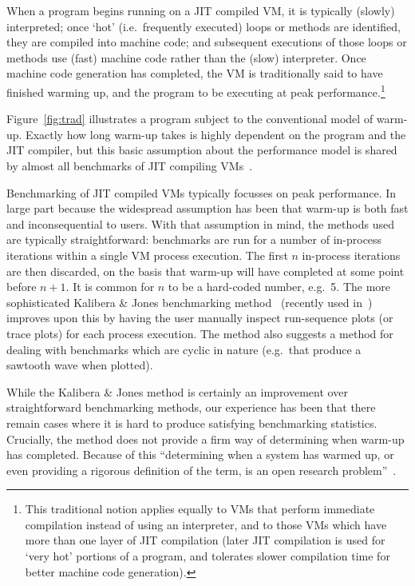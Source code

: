 \documentclass[preprint]{sigplanconf}
\newcommand{\kalibera}{Kalibera \& Jones\xspace}
\begin{document}
When a program begins running on a JIT compiled VM, it is typically (slowly)
interpreted; once `hot' (i.e.~frequently executed) loops or methods are
identified, they are compiled into machine code; and subsequent
executions of those loops or methods use (fast) machine code rather than the
(slow) interpreter. Once machine code generation has completed, the VM is
traditionally said to have finished warming up, and the program to be executing
at peak performance.\footnote{This traditional notion applies equally to VMs
that perform immediate compilation instead of using an interpreter, and to
those VMs which have more than one layer of JIT compilation (later JIT
compilation is used for `very hot' portions of a program, and tolerates slower
compilation time for better machine code generation).}

Figure~\ref{fig:trad} illustrates a
program subject to the conventional model of warm-up. Exactly how long warm-up
takes is highly dependent on
the program and the JIT compiler, but this basic assumption about the
performance model is shared by almost all benchmarks of JIT compiling
VMs~\cite{kalibera13rigorous}.

Benchmarking of JIT compiled VMs typically focusses on peak
performance. In large part because the widespread assumption has been that
warm-up is both fast and inconsequential to users. With that assumption in mind, the
methods used are typically straightforward: benchmarks are run for a number
of in-process iterations within a single VM process execution.
The first $n$ in-process iterations are then discarded, on the basis that warm-up
will have completed at some point before $n+1$. It is common for
$n$ to be a hard-coded number, e.g.~5. The more sophisticated \kalibera
benchmarking method~\cite{kalibera12quantifying,kalibera13rigorous}
(recently used in~\cite{barrett15approaches,grimmer15dynamically}) improves
upon this by having the user manually inspect run-sequence plots (or trace
plots) for each process execution. The method also suggests a method for
dealing with benchmarks which are cyclic in nature (e.g.~that produce a
sawtooth wave when plotted).

While the \kalibera method is certainly an improvement over
straightforward benchmarking methods,
our experience has been that there remain cases where it is hard to produce
satisfying benchmarking statistics. Crucially, the method does not
provide a firm way of determining when warm-up has completed. Because of this
``determining when a system has warmed up, or even providing a
rigorous definition of the term, is an open research problem''~\cite{seaton15phd}.
\end{document}

